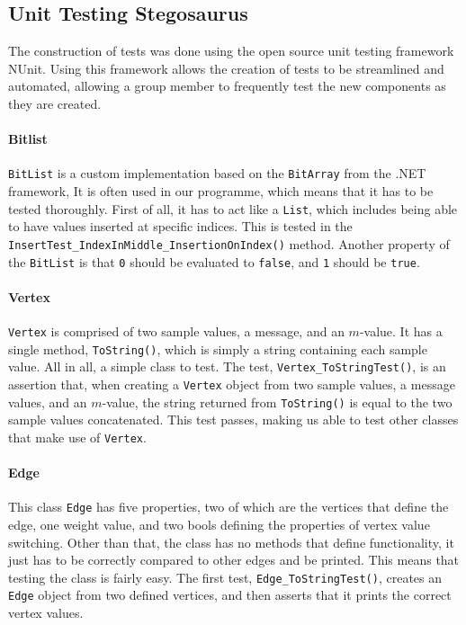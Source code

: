 \subsection{Unit Testing Stegosaurus}
The construction of tests was done using the open source unit testing framework NUnit.
Using this framework allows the creation of tests to be streamlined and automated, allowing a group member to frequently test the new components as they are created.

\paragraph*{Bitlist}
\lstinline|BitList| is a custom implementation based on the \lstinline|BitArray| from the .NET framework, 
It is often used in our programme, which means that it has to be tested thoroughly.
First of all, it has to act like a \lstinline|List|, which includes being able to have values inserted at specific indices.
This is tested in the \lstinline|InsertTest_IndexInMiddle_InsertionOnIndex()| method.
Another property of the \lstinline|BitList| is that \lstinline|0| should be evaluated to \lstinline|false|, and \lstinline|1| should be \lstinline|true|.

\paragraph*{Vertex}
\lstinline|Vertex| is comprised of two sample values, a message, and an $m$-value.
It has a single method, \lstinline|ToString()|, which is simply a string containing each sample value.
All in all, a simple class to test.
The test, \lstinline|Vertex_ToStringTest()|, is an assertion that, when creating a \lstinline|Vertex| object from two sample values, a message values, and an $m$-value, the string returned from \lstinline|ToString()| is equal to the two sample values concatenated.
This test passes, making us able to test other classes that make use of \lstinline|Vertex|.

\paragraph*{Edge}
This class \lstinline|Edge| has five properties, two of which are the vertices that define the edge, one weight value, and two bools defining the properties of vertex value switching.
Other than that, the class has no methods that define functionality, it just has to be correctly compared to other edges and be printed.
This means that testing the class is fairly easy.
The first test, \lstinline|Edge_ToStringTest()|, creates an \lstinline|Edge| object from two defined vertices, and then asserts that it prints the correct vertex values.


